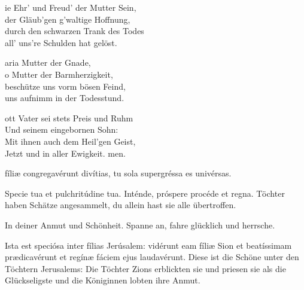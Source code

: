 \documentclass[fontsize=10pt,paper=A5,twoside,BCOR=1mm,DIV=21,headinclude]{scrarticle}
\begin{document}
\begin{paracol}{2}
\begin{hymnus}
	ie Ehr' und Freud' der Mutter Sein,\\
	der Gläub'gen g'waltige Hoffnung,\\
	durch den schwarzen Trank des Todes\\
	all' uns're Schulden hat gelöst.

	aria Mutter der Gnade,\\
	o Mutter der Barmherzigkeit,\\
	beschütze uns vorm bösen Feind,\\
	uns aufnimm in der Todesstund.

	ott Vater sei stets Preis und Ruhm\\
	Und seinem eingebornen Sohn:\\
	Mit ihnen auch dem Heil'gen Geist,\\
	Jetzt und in aller Ewigkeit. men.
\end{hymnus}
\end{paracol}



\begin{paracol}{2}\pcb
{} fíliæ congregavérunt divítias, tu sola supergréssa es univérsas.

\V Specie tua et pulchritúdine tua.
\R Inténde, próspere procéde et regna.
	\switchcolumn
	 Töchter haben Schätze angesammelt, du allein hast sie alle übertroffen.
	
	\V In deiner Anmut und Schönheit.
	\R Spanne an, fahre glücklich und herrsche.
\end{paracol}


\vspace{.3em}

\begin{paracol}{2}\pcb
\A Ista est speciósa inter fílias Jerúsalem: vidérunt eam fíliæ Sion et beatíssimam prædicavérunt et regínæ fáciem ejus laudavérunt.
	\switchcolumn
	\A Diese ist die Schöne unter den Töchtern Jerusalems: Die Töchter Zions erblickten sie und priesen sie als die Glückseligste und die Königinnen lobten ihre Anmut.
\end{paracol}

\pagebreak
{}

\vspace{.3em}
\end{document}
